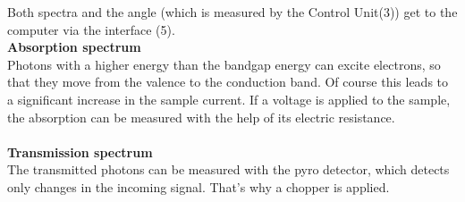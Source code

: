 Both spectra and the angle (which is measured by the Control Unit(3)) get to the computer via the interface (5).\\
\textbf{Absorption spectrum}\\
Photons with a higher energy than the bandgap energy can excite electrons, so that they move from the valence to the conduction band. Of course this leads to a significant increase in the sample current. If a voltage is applied to the sample, the absorption can be measured with the help of its electric resistance.\\
\\
\textbf{Transmission spectrum}\\
The transmitted photons can be measured with the pyro detector, which detects only changes in the incoming signal. That's why a chopper is applied.\\
\\
